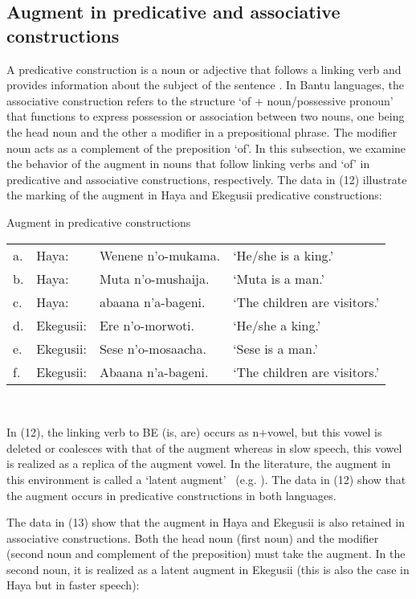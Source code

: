 \documentclass[output=paper]{langscibook}
\begin{document}
\subsection{Augment in predicative and associative constructions}
	A predicative construction is a noun or adjective that follows a linking verb and provides information about the subject of the sentence \citep{aarts2011oxford}. In Bantu languages, the associative construction refers to the structure ‘of + noun/possessive pronoun’ that functions to express possession or association between two nouns, one being the head noun and the other a modifier in a prepositional phrase. The modifier noun acts as a complement of the preposition ‘of’. In this subsection, we examine the behavior of the augment in nouns that follow linking verbs and ‘of’ in predicative and associative constructions, respectively. The data in (12) illustrate the marking of the augment in Haya and Ekegusii predicative constructions:

\begin{exe}
\ex Augment in predicative constructions\\
\label{hayagusii12}
\begin{tabular}{llll}
 a.	& Haya: &		Wenene n’o-mukama.	&	‘He/she is a king.’ \\
b.& 	Haya: 	&	Muta n’o-mushaija.	&	‘Muta is a man.’\\
c. &	Haya: 	&	abaana n’a-bageni.	&	‘The children are visitors.’\\
d. &	Ekegusii: &	Ere n’o-morwoti.	&	‘He/she a king.’\\
e. &	Ekegusii: &	Sese n’o-mosaacha.	&	‘Sese is a man.’\\
f. &	Ekegusii: &	Abaana n’a-bageni.	&	‘The children are visitors.’
\end{tabular}\\
\end{exe}
In (12), the linking verb to BE (is, are) occurs as n+vowel, but this vowel is deleted or coalesces with that of the augment whereas in slow speech, this vowel is realized as a replica of the augment vowel. In the literature, the augment in this environment is called a ‘latent augment’ \ (e.g. \cite{blois1970augment}). The data in (12) show that the augment occurs in predicative constructions in both languages.

The data in (13) show that the augment in Haya and Ekegusii is also retained in associative constructions. Both the head noun (first noun) and the modifier (second noun and complement of the preposition) must take the augment. In the second noun, it is realized as a latent augment in Ekegusii (this is also the case in Haya but in faster speech):
\end{document}
